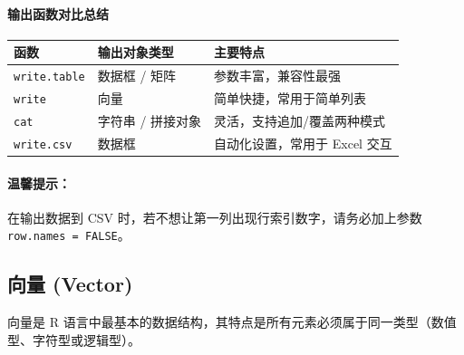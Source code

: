 \paragraph{输出函数对比总结}
\begin{table}[h]
\centering
\renewcommand{\arraystretch}{1.5}
\begin{tabular}{|l|l|l|}
\hline
\textbf{函数} & \textbf{输出对象类型} & \textbf{主要特点} \\ \hline
\texttt{write.table} & 数据框 / 矩阵 & 参数丰富，兼容性最强 \\ \hline
\texttt{write} & 向量 & 简单快捷，常用于简单列表 \\ \hline
\texttt{cat} & 字符串 / 拼接对象 & 灵活，支持追加/覆盖两种模式 \\ \hline
\texttt{write.csv} & 数据框 & 自动化设置，常用于 Excel 交互 \\ \hline
\end{tabular}
\end{table}

\paragraph{温馨提示：}
在输出数据到 CSV 时，若不想让第一列出现行索引数字，请务必加上参数 \texttt{row.names = FALSE}。

\subsection{向量 (Vector)}

向量是 R 语言中最基本的数据结构，其特点是所有元素必须属于同一类型（数值型、字符型或逻辑型）。

